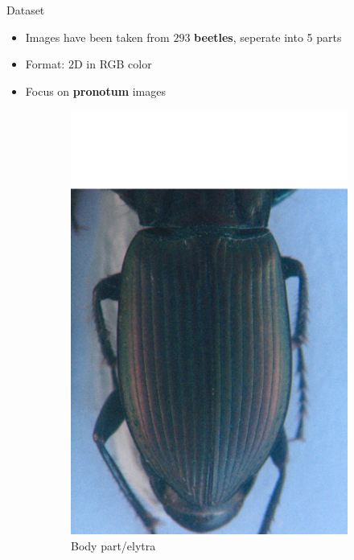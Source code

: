 \documentclass[10pt,svgnames]{beamer}
\begin{document}


\begin{frame}[c]{Dataset}
	\begin{itemize}
    	\item Images have been taken from $293$ \textbf{beetles}, seperate into 5 parts
    	\item Format: $2$D in RGB color
    	\item Focus on \textbf{\color{red}pronotum} images
  	\end{itemize}
	
	\begin{figure}[htbp]
    			\begin{subfigure}[t]{0.3\textwidth}
        			\centering
        			\includegraphics[scale=.2]{images/elytre2}
        			\caption*{\footnotesize{Body part/elytra}}
        			\label{figsub22}
    			\end{subfigure}
    			~ 
    			\begin{subfigure}[t]{0.3\textwidth}

\end{subfigure}
\end{figure}
\end{frame}
\end{document}
